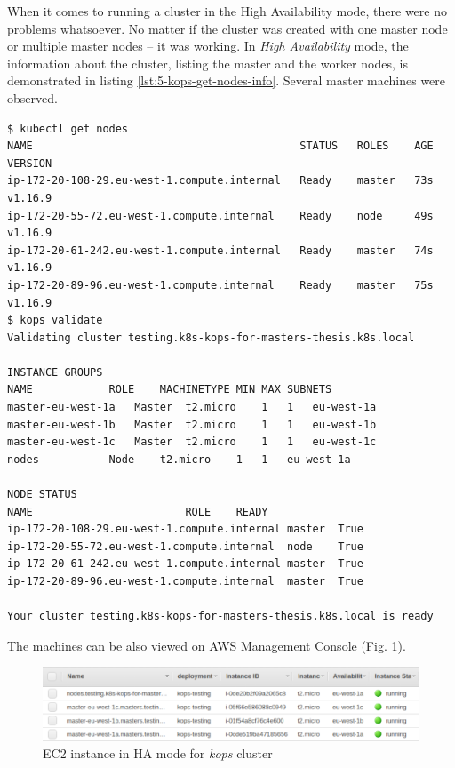 When it comes to running a cluster in the High Availability mode, there were no problems whatsoever. No matter if the cluster was created with one master node or multiple master nodes -- it was working. In \textit{High Availability} mode, the information about the cluster, listing the master and the worker nodes, is demonstrated in listing \ref{lst:5-kops-get-nodes-info}. Several master machines were observed.
\begin{lstlisting}[basicstyle=\scriptsize,xleftmargin=0cm,label=lst:5-kops-get-nodes-info,caption={Getting information about the cluster}]
$ kubectl get nodes
NAME                                          STATUS   ROLES    AGE   VERSION
ip-172-20-108-29.eu-west-1.compute.internal   Ready    master   73s   v1.16.9
ip-172-20-55-72.eu-west-1.compute.internal    Ready    node     49s   v1.16.9
ip-172-20-61-242.eu-west-1.compute.internal   Ready    master   74s   v1.16.9
ip-172-20-89-96.eu-west-1.compute.internal    Ready    master   75s   v1.16.9
$ kops validate
Validating cluster testing.k8s-kops-for-masters-thesis.k8s.local

INSTANCE GROUPS
NAME			ROLE	MACHINETYPE	MIN	MAX	SUBNETS
master-eu-west-1a	Master	t2.micro	1	1	eu-west-1a
master-eu-west-1b	Master	t2.micro	1	1	eu-west-1b
master-eu-west-1c	Master	t2.micro	1	1	eu-west-1c
nodes			Node	t2.micro	1	1	eu-west-1a

NODE STATUS
NAME						ROLE	READY
ip-172-20-108-29.eu-west-1.compute.internal	master	True
ip-172-20-55-72.eu-west-1.compute.internal	node	True
ip-172-20-61-242.eu-west-1.compute.internal	master	True
ip-172-20-89-96.eu-west-1.compute.internal	master	True

Your cluster testing.k8s-kops-for-masters-thesis.k8s.local is ready
\end{lstlisting}

The machines can be also viewed on AWS Management Console (Fig. \ref{fig:k8s-kops-ha-aws}).
\begin{figure}[H]
    \centering
    \includegraphics[width=16cm]{figures/k8s-kops-ha-aws-small.png}
    \captionsetup{justification=centering,margin=2cm}
    \caption{EC2 instance in HA mode for \textit{kops} cluster}
    \label{fig:k8s-kops-ha-aws}
\end{figure}

